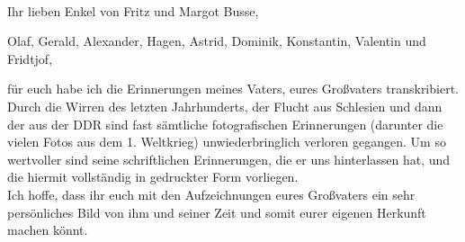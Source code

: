 \leavevmode \\
Ihr lieben Enkel von Fritz und Margot Busse,\\

\begin{addmargin}[25pt]{30pt}
Olaf, Gerald, Alexander, Hagen, Astrid, Dominik, Konstantin, Valentin und Fridtjof,\\
\end{addmargin}

\noindent
für euch habe ich die Erinnerungen meines Vaters, eures Großvaters transkribiert. Durch die Wirren des letzten Jahrhunderts, der Flucht aus Schlesien und dann der aus der DDR sind fast sämtliche fotografischen Erinnerungen (darunter die vielen Fotos aus dem 1. Weltkrieg) unwiederbringlich verloren gegangen. Um so wertvoller sind seine schriftlichen Erinnerungen, die er uns hinterlassen hat, und die hiermit vollständig in gedruckter Form vorliegen.\\

\noindent
Ich hoffe, dass ihr euch mit den Aufzeichnungen eures Großvaters ein sehr persönliches Bild von ihm und seiner Zeit und somit eurer eigenen Herkunft machen könnt.\\

 \leavevmode \\

